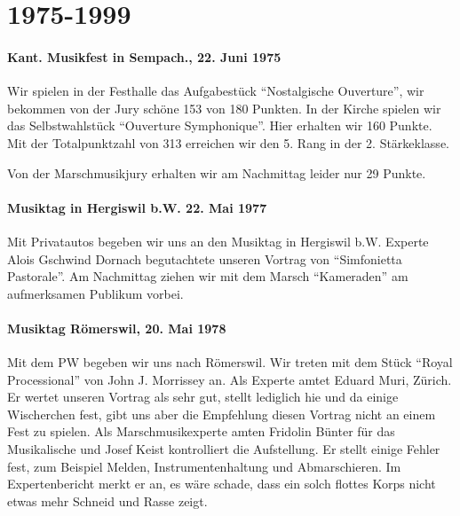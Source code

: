 \chapter{1975-1999}

\begin{history}

    \subsubsection*{Kant. Musikfest in Sempach., 22. Juni 1975}

    Wir spielen in der Festhalle das Aufgabestück \enquote{Nostalgische
        Ouverture}, wir bekommen von der Jury schöne 153 von 180 Punkten. In der
    Kirche spielen wir das Selbstwahlstück \enquote{Ouverture Symphonique}.
    Hier erhalten wir 160 Punkte. Mit der Totalpunktzahl von 313 erreichen
    wir den 5. Rang in der 2. Stärkeklasse.

    Von der Marschmusikjury erhalten wir am Nachmittag leider nur 29 Punkte.


    \subsubsection*{Musiktag in Hergiswil b.W. 22. Mai 1977}

    Mit Privatautos begeben wir uns an den Musiktag in Hergiswil b.W. Experte
    Alois Gschwind Dornach begutachtete unseren Vortrag von \enquote{Simfonietta
        Pastorale}. Am Nachmittag ziehen wir mit dem Marsch \enquote{Kameraden} am
    aufmerksamen Publikum vorbei.


    \subsubsection*{Musiktag Römerswil, 20. Mai 1978}

    Mit dem PW begeben wir uns nach Römerswil. Wir treten mit dem Stück
    \enquote{Royal Processional} von John J. Morrissey an. Als Experte amtet
    Eduard Muri, Zürich. Er wertet unseren Vortrag als sehr gut, stellt
    lediglich hie und da einige Wischerchen fest, gibt uns aber die Empfehlung
    diesen Vortrag nicht an einem Fest zu spielen. Als Marschmusikexperte amten
    Fridolin Bünter für das Musikalische und Josef Keist kontrolliert die
    Aufstellung. Er stellt einige Fehler fest, zum Beispiel Melden,
    Instrumentenhaltung und Abmarschieren. Im Expertenbericht merkt er an, es
    wäre schade, dass ein solch flottes Korps nicht etwas mehr Schneid und Rasse
    zeigt.



\end{history}
